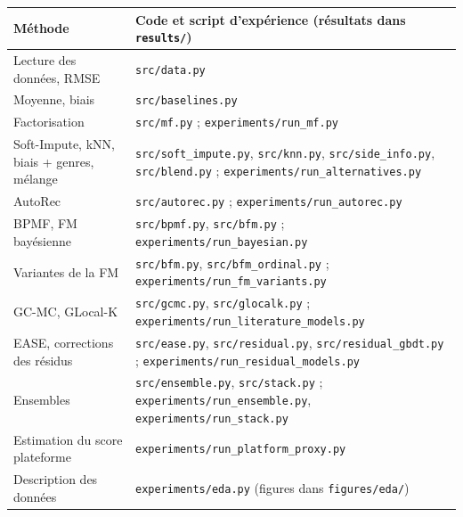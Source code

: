 \documentclass[11pt,a4paper]{article}
\begin{document}
\begin{center}
\small
\begin{tabularx}{\linewidth}{@{}lX@{}}
\toprule
\textbf{Méthode} & \textbf{Code} et \textbf{script d'expérience} (résultats dans \texttt{results/}) \\
\midrule
Lecture des données, RMSE & \texttt{src/data.py} \\
Moyenne, biais & \texttt{src/baselines.py} \\
Factorisation & \texttt{src/mf.py} ; \texttt{experiments/run\_mf.py} \\
Soft-Impute, kNN, biais + genres, mélange & \texttt{src/soft\_impute.py}, \texttt{src/knn.py},
  \texttt{src/side\_info.py}, \texttt{src/blend.py} ; \texttt{experiments/run\_alternatives.py} \\
AutoRec & \texttt{src/autorec.py} ; \texttt{experiments/run\_autorec.py} \\
BPMF, FM bayésienne & \texttt{src/bpmf.py}, \texttt{src/bfm.py} ; \texttt{experiments/run\_bayesian.py} \\
Variantes de la FM & \texttt{src/bfm.py}, \texttt{src/bfm\_ordinal.py} ; \texttt{experiments/run\_fm\_variants.py} \\
GC-MC, GLocal-K & \texttt{src/gcmc.py}, \texttt{src/glocalk.py} ; \texttt{experiments/run\_literature\_models.py} \\
EASE, corrections des résidus & \texttt{src/ease.py}, \texttt{src/residual.py}, \texttt{src/residual\_gbdt.py} ;
  \texttt{experiments/run\_residual\_models.py} \\
Ensembles & \texttt{src/ensemble.py}, \texttt{src/stack.py} ; \texttt{experiments/run\_ensemble.py},
  \texttt{experiments/run\_stack.py} \\
Estimation du score plateforme & \texttt{experiments/run\_platform\_proxy.py} \\
Description des données & \texttt{experiments/eda.py} (figures dans \texttt{figures/eda/}) \\
\bottomrule
\end{tabularx}
\end{center}
\end{document}
